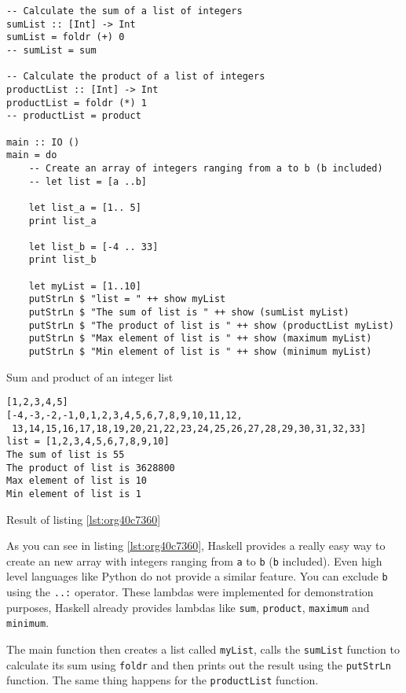 \documentclass[a4paper, titlepage, twoside]{article}
\begin{document}
\begin{listing}[htbp]
\begin{verbatim}
-- Calculate the sum of a list of integers
sumList :: [Int] -> Int
sumList = foldr (+) 0
-- sumList = sum
  
-- Calculate the product of a list of integers
productList :: [Int] -> Int
productList = foldr (*) 1
-- productList = product

main :: IO ()
main = do
    -- Create an array of integers ranging from a to b (b included)
    -- let list = [a ..b]

    let list_a = [1.. 5]
    print list_a

    let list_b = [-4 .. 33]
    print list_b

    let myList = [1..10]
    putStrLn $ "list = " ++ show myList
    putStrLn $ "The sum of list is " ++ show (sumList myList)
    putStrLn $ "The product of list is " ++ show (productList myList)
    putStrLn $ "Max element of list is " ++ show (maximum myList)
    putStrLn $ "Min element of list is " ++ show (minimum myList)
\end{verbatim}
\caption{\label{lst:org40c7360}Sum and product of an integer list}
\end{listing}

\begin{listing}[htbp]
\begin{verbatim}
[1,2,3,4,5]
[-4,-3,-2,-1,0,1,2,3,4,5,6,7,8,9,10,11,12,
 13,14,15,16,17,18,19,20,21,22,23,24,25,26,27,28,29,30,31,32,33]
list = [1,2,3,4,5,6,7,8,9,10]
The sum of list is 55
The product of list is 3628800
Max element of list is 10
Min element of list is 1
\end{verbatim}
\caption{Result of listing \ref{lst:org40c7360}}
\end{listing}

As you can see in listing \ref{lst:org40c7360}, Haskell provides a really easy way to create an new array with integers ranging from \texttt{a} to \texttt{b} (\texttt{b} included). Even high level languages like Python do not provide a similar feature. You can exclude \texttt{b} using the \texttt{..:} operator. These lambdas were implemented for demonstration purposes, Haskell already provides lambdas like \texttt{sum}, \texttt{product}, \texttt{maximum} and \texttt{minimum}.

The main function then creates a list called \texttt{myList}, calls the \texttt{sumList} function to calculate its sum using \texttt{foldr} and then prints out the result using the \texttt{putStrLn} function. The same thing happens for the \texttt{productList} function.
\end{document}

